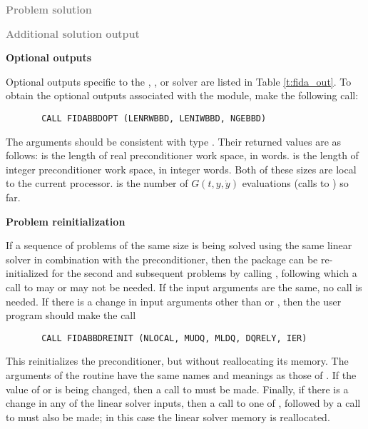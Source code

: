 \begin{Steps}
\item \textcolor{gray}{\bf Problem solution}

\item \textcolor{gray}{\bf Additional solution output}
  
\item {\bf {\idabbdpre} Optional outputs}

  Optional outputs specific to the {\spgmr}, {\spbcg}, or {\sptfqmr} solver are 
  listed in Table \ref{t:fida_out}.
  To obtain the optional outputs associated with the {\idabbdpre}
  module, make the following call:
\begin{verbatim}
       CALL FIDABBDOPT (LENRWBBD, LENIWBBD, NGEBBD)
\end{verbatim}
  The arguments should be consistent with {\CC} type .  Their
  returned values are as follows:
   is the length of real preconditioner work space, in 
  words.   is the length of integer preconditioner work space, in
  integer words.  Both of these sizes are local to the current processor.
   is the number of $G(t,y,\dot{y})$ evaluations (calls to )
  so far.
  
\item {\bf Problem reinitialization}
  
  If a sequence of problems of the same size is being solved using the same
  linear solver in combination with the {\idabbdpre}
  preconditioner, then the {\ida} package can be re-initialized for the second
  and subsequent problems by calling , following which a call
  to  may or  may not be needed.
  If the input arguments are the same, no  call is needed.
  If there is a change in input arguments other than  or , 
  then the user program should make the call 
\begin{verbatim}
       CALL FIDABBDREINIT (NLOCAL, MUDQ, MLDQ, DQRELY, IER)
\end{verbatim}
  This reinitializes the {\idabbdpre} preconditioner, but without
  reallocating its memory.  The arguments of the 
  routine have the same names and meanings as those of .
  If the value of  or  is being changed, then a call to
   must be made.  Finally, if there is a change in any of the
  linear solver inputs, then a call to one of ,
  followed by a call to  must
  also be made; in this case the linear solver memory is reallocated.


\end{Steps}
